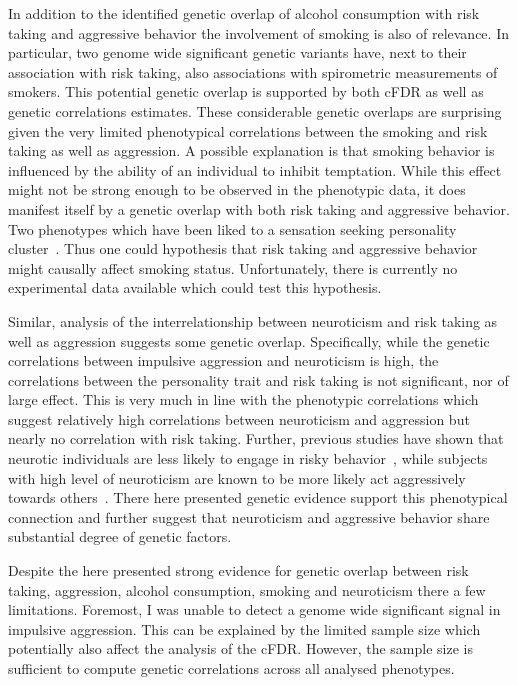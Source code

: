 In addition to the identified genetic overlap of alcohol consumption with risk taking and aggressive behavior the involvement of smoking is also of relevance.
In particular, two genome wide significant genetic variants have, next to their association with risk taking, also associations with spirometric measurements of smokers.
This potential genetic overlap is supported by both cFDR as well as genetic correlations estimates.
These considerable genetic overlaps are surprising given the very limited phenotypical correlations between the smoking and risk taking as well as aggression.
A possible explanation is that smoking behavior is influenced by the ability of an individual to  inhibit temptation.
While this effect might not be strong enough to be observed in the phenotypic data, it does manifest itself by a genetic overlap with both risk taking and aggressive behavior.
Two phenotypes which have been liked to a sensation seeking personality cluster~\cite{Zuckerman2000}.
Thus one could hypothesis that risk taking and aggressive behavior might causally affect smoking status.
Unfortunately, there is currently no experimental data available which could test this hypothesis.

Similar, analysis of the interrelationship between neuroticism and risk taking as well as aggression suggests some genetic overlap.
Specifically, while the genetic correlations between impulsive aggression and neuroticism is high, the correlations between the personality trait and risk taking is not significant, nor of large effect.
This is very much in line with the phenotypic correlations which suggest relatively high correlations between neuroticism and aggression but nearly no correlation with risk taking.
Further, previous studies have shown that neurotic individuals are less likely to engage in risky behavior~\cite{Lauriola2001,InstituteofMedicine2011,Paulus2003}, while subjects with high level of neuroticism are known to be more likely act aggressively towards others~\cite{Meesters2007}.
There here presented genetic evidence support this phenotypical connection and further suggest that neuroticism and aggressive behavior share substantial degree of genetic factors.

Despite the here presented strong evidence for genetic overlap between risk taking, aggression, alcohol consumption, smoking and neuroticism there a few limitations.
Foremost, I was unable to detect a genome wide significant signal in impulsive aggression.
This can be explained by the limited sample size which potentially also affect the analysis of the cFDR\@.
However, the sample size is sufficient to compute genetic correlations across all analysed phenotypes.

